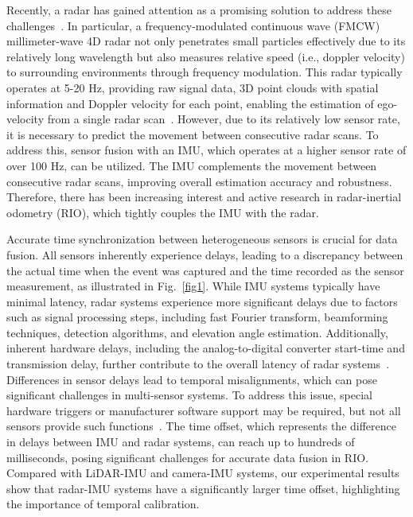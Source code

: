 Recently, a radar has gained attention as a promising solution to address these challenges~\cite{10683889}. In particular, a frequency-modulated continuous wave (FMCW) millimeter-wave 4D radar not only penetrates small particles effectively due to its relatively long wavelength but also measures relative speed (i.e., doppler velocity) to surrounding environments through frequency modulation. This radar typically operates at 5-20 Hz, providing raw signal data, 3D point clouds with spatial information and Doppler velocity for each point, enabling the estimation of ego-velocity from a single radar scan~\cite{6728341}. However, due to its relatively low sensor rate, it is necessary to predict the movement between consecutive radar scans. To address this, sensor fusion with an IMU, which operates at a higher sensor rate of over 100 Hz, can be utilized. The IMU complements the movement between consecutive radar scans, improving overall estimation accuracy and robustness. Therefore, there has been increasing interest and active research in radar-inertial odometry (RIO), which tightly couples the IMU with the radar.

Accurate time synchronization between heterogeneous sensors is crucial for data fusion. All sensors inherently experience delays, leading to a discrepancy between the actual time when the event was captured and the time recorded as the sensor measurement, as illustrated in Fig.~\ref{fig1}. While IMU systems typically have minimal latency, radar systems experience more significant delays due to factors such as signal processing steps, including fast Fourier transform, beamforming techniques, detection algorithms, and elevation angle estimation. Additionally, inherent hardware delays, including the analog-to-digital converter start-time and transmission delay, further contribute to the overall latency of radar systems~\cite{10477463}. Differences in sensor delays lead to temporal misalignments, which can pose significant challenges in multi-sensor systems. To address this issue, special hardware triggers or manufacturer software support may be required, but not all sensors provide such functions~\cite{10610666}. The time offset, which represents the difference in delays between IMU and radar systems, can reach up to hundreds of milliseconds, posing significant challenges for accurate data fusion in RIO. Compared with LiDAR-IMU and camera-IMU systems, our experimental results show that radar-IMU systems have a significantly larger time offset, highlighting the importance of temporal calibration.

